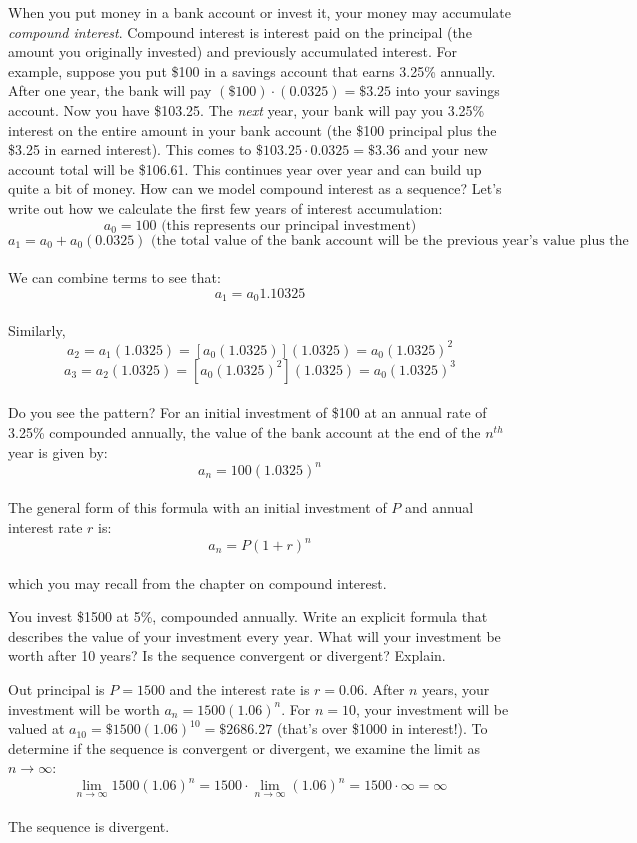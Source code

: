 When you put money in a bank account or invest it, your money may 
accumulate \textit{compound interest}. Compound interest is interest 
paid on the principal (the amount you originally invested) and 
previously accumulated interest. For example, suppose you put \$100 
in a savings account that earns 3.25\% annually. After one year, the 
bank will pay $(\$100)\cdot (0.0325) = \$3.25$ into your savings 
account. Now you have \$103.25. The \textit{next} year, your bank will 
pay you 3.25\% interest on the entire amount in your bank account 
(the \$100 principal plus the \$3.25 in earned interest). This comes 
to $\$103.25 \cdot 0.0325 = \$3.36$ and your new account total will be 
\$106.61. This continues year over year and can build up quite a bit 
of money. How can we model compound interest as a sequence? Let's 
write out how we calculate the first few years of interest 
accumulation:
$$a_0 = 100\text{ (this represents our principal investment)}$$
$$a_1 = a_0 + a_0(0.0325)\text{ (the total value of the bank account 
will be the previous year's value plus the interest)}$$\\
We can combine terms to see that:
$$a_1 = a_0{1.10325}$$\\
Similarly, 
$$a_2 = a_1(1.0325) = [a_0(1.0325)](1.0325) = a_0(1.0325)^2$$
$$a_3 = a_2(1.0325) = [a_0(1.0325)^2](1.0325) = a_0(1.0325)^3$$\\
Do you see the pattern? For an initial investment of \$100 at an 
annual rate of 3.25\% compounded annually, the value of the bank 
account at the end of the $n^{th}$ year is given by:
$$a_n = 100(1.0325)^{n}$$\\
The general form of this formula with an initial investment of $P$ 
and annual interest rate $r$ is:
$$a_n = P(1+r)^{n}$$\\
which you may recall from the chapter on compound interest. 

\begin{Exercise}[label=seqcalc5]
You invest \$1500 at 5\%, compounded annually. Write an explicit 
formula that describes the value of your investment every year. 
What will your investment be worth after 10 years? Is the sequence 
convergent or divergent? Explain. 
\end{Exercise}

\begin{Answer}[ref=seqcalc5]
Out principal is $P = 1500$ and the interest rate is $r = 0.06$. 
After $n$ years, your investment will be worth $a_n = 1500(1.06)^{n}$. 
For $n = 10$, your investment will be valued at $a_{10} = \$1500
(1.06)^{10} = \$2686.27$ (that's over \$1000 in interest!). To 
determine if the sequence is convergent or divergent, we examine the 
limit as $n \to \infty$:
$$\lim_{n \to \infty} 1500(1.06)^n = 1500\cdot \lim_{n \to \infty}
(1.06)^n = 1500 \cdot \infty = \infty$$\\
The sequence is divergent. 
\end{Answer}

\begin{Exercise}[label=seqcalc6]

\end{Exercise}

